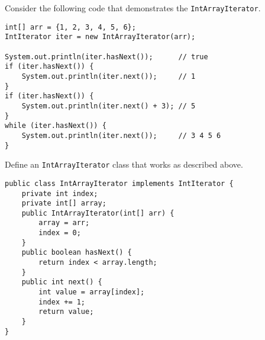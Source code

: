 \begin{blocksection}
\question Consider the following code that demonstrates the
\lstinline$IntArrayIterator$.

\begin{lstlisting}
int[] arr = {1, 2, 3, 4, 5, 6};
IntIterator iter = new IntArrayIterator(arr);

System.out.println(iter.hasNext());      // true
if (iter.hasNext()) {
    System.out.println(iter.next());     // 1
}
if (iter.hasNext()) {
    System.out.println(iter.next() + 3); // 5
}
while (iter.hasNext()) {
    System.out.println(iter.next());     // 3 4 5 6
}
\end{lstlisting}

Define an \lstinline$IntArrayIterator$ class that works as described above.

\begin{solution}[3in]
\begin{lstlisting}
public class IntArrayIterator implements IntIterator {
    private int index;
    private int[] array;
    public IntArrayIterator(int[] arr) {
        array = arr;
        index = 0;
    }
    public boolean hasNext() {
        return index < array.length;
    }
    public int next() {
        int value = array[index];
        index += 1;
        return value;
    }
}
\end{lstlisting}
\end{solution}
\end{blocksection}
